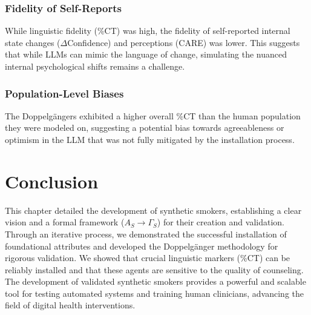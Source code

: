 \subsubsection{Fidelity of Self-Reports}

While linguistic fidelity (\%CT) was high, the fidelity of self-reported internal state changes ($\Delta$Confidence) and perceptions (CARE) was lower. This suggests that while LLMs can mimic the language of change, simulating the nuanced internal psychological shifts remains a challenge.

\subsubsection{Population-Level Biases}

The Doppelgängers exhibited a higher overall \%CT than the human population they were modeled on, suggesting a potential bias towards agreeableness or optimism in the LLM that was not fully mitigated by the installation process.

\section{Conclusion}

This chapter detailed the development of synthetic smokers, establishing a clear vision and a formal framework ($A_S \rightarrow \Gamma_S$) for their creation and validation. Through an iterative process, we demonstrated the successful installation of foundational attributes and developed the Doppelgänger methodology for rigorous validation. We showed that crucial linguistic markers (\%CT) can be reliably installed and that these agents are sensitive to the quality of counseling. The development of validated synthetic smokers provides a powerful and scalable tool for testing automated systems and training human clinicians, advancing the field of digital health interventions.
